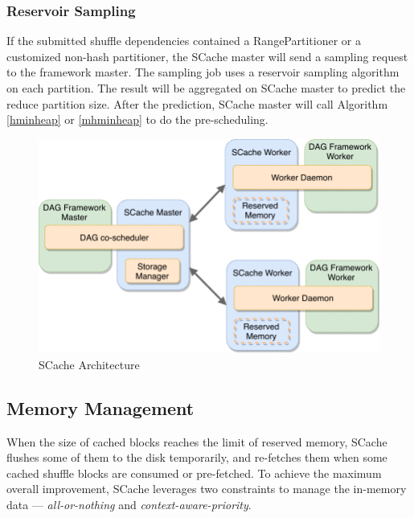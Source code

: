 \subsubsection{Reservoir Sampling}\label{sampling}
{\color{blue}
If the submitted shuffle dependencies contained a RangePartitioner or a customized non-hash partitioner, the SCache master will send a sampling request to the framework master. 
The sampling job uses a reservoir sampling algorithm \cite{reservoir} on each partition. 
The result will be aggregated on SCache master to predict the reduce partition size.
After the prediction, SCache master will call Algorithm \ref{hminheap} or \ref{mhminheap} to do the pre-scheduling.
}

\begin{figure}
	\centering
	\includegraphics[width=.7\linewidth]{fig/architecture}
	\caption{\color{black}SCache Architecture}
	\label{fig:architecture}
\end{figure}

\subsection{Memory Management}\label{memorymanage}
When the size of cached blocks reaches the limit of reserved memory, SCache flushes some of them to the disk temporarily, and re-fetches them when some cached shuffle blocks are consumed or pre-fetched. 
To achieve the maximum overall improvement, SCache leverages two constraints to manage the in-memory data --- \textit{all-or-nothing} and \textit{context-aware-priority}.

